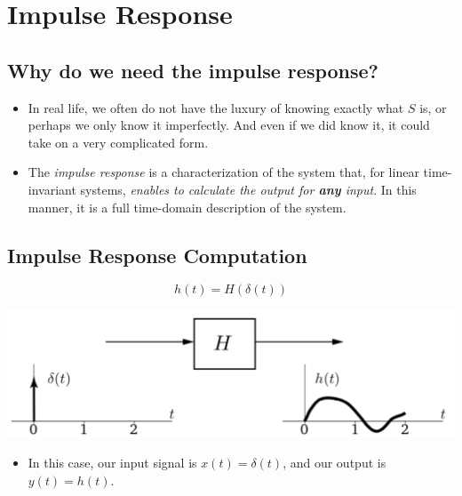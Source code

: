 \documentclass[10pt]{article}
\begin{document}
\section*{Impulse Response}
\subsection*{Why do we need the impulse response?}
\begin{itemize}
    \item In real life, we often do not have the luxury of knowing exactly what $S$ is, or perhaps we only know it imperfectly.  And even if we did know it, it could take on a very complicated form.
    \item The \textit{impulse response} is a characterization of the system that, for linear time-invariant systems, \textit{enables to calculate the output for \textbf{any} input}.  In this manner, it is a full time-domain description of the system.
\end{itemize}
\subsection*{Impulse Response Computation}
\[h(t) = H(\delta(t))\]
\begin{center}
    \includegraphics[scale=0.6]{W3_1.png}
\end{center}
\begin{itemize}
    \item In this case, our input signal is $x(t) = \delta(t)$, and our output is $y(t) = h(t)$.
\end{itemize}
\end{document}
